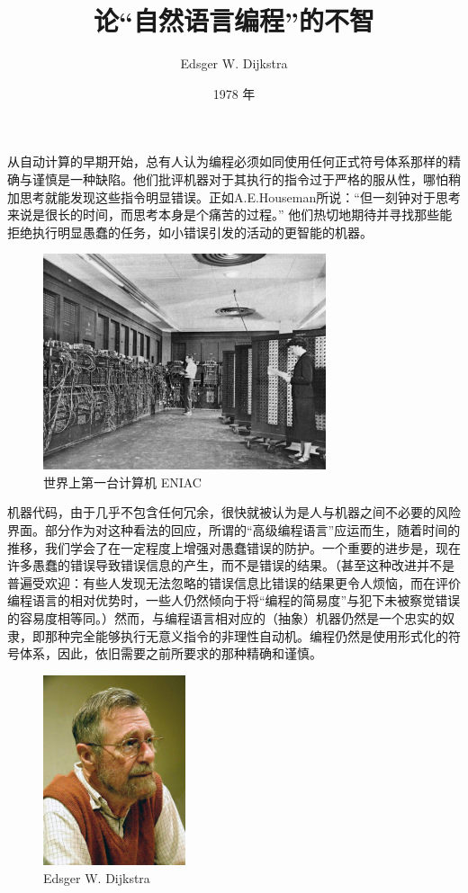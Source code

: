 \documentclass[a4paper,12pt]{article}
\title{论“自然语言编程”的不智}
\date{1978 年}
\author{Edsger W. Dijkstra}
\begin{document}
\maketitle{}

从自动计算的早期开始，总有人认为编程必须如同使用任何正式符号体系那样的精确与谨慎是一种缺陷。他们批评机器对于其执行的指令过于严格的服从性，哪怕稍加思考就能发现这些指令明显错误。正如A.E.Houseman所说：“但一刻钟对于思考来说是很长的时间，而思考本身是个痛苦的过程。” 他们热切地期待并寻找那些能拒绝执行明显愚蠢的任务，如小错误引发的活动的更智能的机器。

\begin{figure}[ht]
    \centering
    \includegraphics[height=2.5in]{images/ENIAC.jpeg}
    \caption{世界上第一台计算机 ENIAC}
\end{figure}

机器代码，由于几乎不包含任何冗余，很快就被认为是人与机器之间不必要的风险界面。部分作为对这种看法的回应，所谓的“高级编程语言”应运而生，随着时间的推移，我们学会了在一定程度上增强对愚蠢错误的防护。一个重要的进步是，现在许多愚蠢的错误导致错误信息的产生，而不是错误的结果。（甚至这种改进并不是普遍受欢迎：有些人发现无法忽略的错误信息比错误的结果更令人烦恼，而在评价编程语言的相对优势时，一些人仍然倾向于将“编程的简易度”与犯下未被察觉错误的容易度相等同。）然而，与编程语言相对应的（抽象）机器仍然是一个忠实的奴隶，即那种完全能够执行无意义指令的非理性自动机。编程仍然是使用形式化的符号体系，因此，依旧需要之前所要求的那种精确和谨慎。

\begin{figure}
    \centering
    \includegraphics[height=2.2in]{images/Edsger_Wybe_Dijkstra.jpeg}
    \caption{Edsger W. Dijkstra}
\end{figure}
\end{document}
